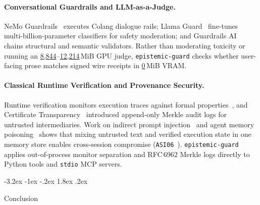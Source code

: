 \documentclass[10pt,twocolumn]{article}
\makeatletter
\renewcommand\section{\@startsection{section}{1}{\z@}%
  {-3.2ex \@plus -1ex \@minus -.2ex}%
  {1.8ex \@plus .2ex}%
  {\normalfont\Large\bfseries\raggedright}}
\makeatother
\begin{document}
\paragraph{Conversational Guardrails and LLM-as-a-Judge.}
NeMo Guardrails~\cite{rebedea2023nemo} executes Colang dialogue rails; Llama Guard~\cite{inan2023llamaguard} fine-tunes multi-billion-parameter classifiers for safety moderation; and Guardrails AI~\cite{guardrailsai2024} chains structural and semantic validators. Rather than moderating toxicity or running an \href{https://github.com/AlienatedAliens/epistemic-guard/blob/v0.5.2/results/table3_heldout_supervision.json\#L166}{8,844}--\href{https://github.com/AlienatedAliens/epistemic-guard/blob/v0.5.2/results/table3_heldout_supervision.json\#L182}{12,214}\,MiB GPU judge, \texttt{epistemic-guard} checks whether user-facing prose matches signed wire receipts in \href{https://github.com/AlienatedAliens/epistemic-guard/blob/v0.5.2/results/table3_heldout_supervision.json\#L84}{0}\,MiB VRAM.

\paragraph{Classical Runtime Verification and Provenance Security.}
Runtime verification monitors execution traces against formal properties~\cite{leucker2009brief,bartocci2018lectures}, and Certificate Transparency~\cite{laurie2013rfc6962} introduced append-only Merkle audit logs for untrusted intermediaries. Work on indirect prompt injection~\cite{greshake2023indirect} and agent memory poisoning~\cite{maxwell2026poisoning,maxwell2026fivelayer} shows that mixing untrusted text and verified execution state in one memory store enables cross-session compromise (\texttt{ASI06}~\cite{owasp2026agentic}). \texttt{epistemic-guard} applies out-of-process monitor separation and RFC\,6962 Merkle logs directly to Python tools and \texttt{stdio} MCP servers.

\section{Conclusion}
\label{sec:conclusion}
\end{document}
